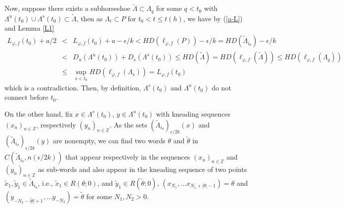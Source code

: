 \documentclass[12pt]{amsart}
\providecommand{\abs}[1]{\lvert#1\rvert}
\theoremstyle{plain} %
\theoremstyle{definition} %
\numberwithin{equation}{section}
\begin{document}
Now, suppose there exists a subhorseshoe $\widetilde{\Lambda}\subset\Lambda_q$ for some $q<t_0$ with $\Lambda ^u(t_0) \cup \Lambda ^s(t_0) \subset \widetilde{\Lambda}$, then as $\Lambda_t\subset P$ for $t_0<t\leq t(h)$, we have by (\ref{a-L}) and Lemma \ref{L1}
\begin{eqnarray*}
L_{\varphi, f}(t_0)+a/2 &<& L_{\varphi, f}(t_0)+a-\epsilon/k <HD(\ell_{\varphi,f}(P))-\epsilon/k =HD(\tilde{\Lambda}_{i_0}) -\epsilon/k \\ &<& D_u(\Lambda ^u(t_0))+D_s(\Lambda ^s(t_0)) \leq HD(\widetilde{\Lambda})=HD(\ell_{\varphi,f}(\widetilde{\Lambda})) \leq HD(\ell_{\varphi,f}(\Lambda_q))\\ &\leq& \sup \limits_{s <t_0} HD(\ell_{\varphi,f}(\Lambda_s)) = L_{\varphi, f}(t_0)
\end{eqnarray*}
which is a contradiction. Then, by definition, $ \Lambda^s(t_0)$ and $ \Lambda^u(t_0)$ do not connect before $t_0$.

On the other hand, fix $x\in \Lambda ^s(t_0)$, $y\in \Lambda ^u(t_0)$ with kneading sequences $(x_n)_{n\in \mathbb{Z}}$, respectively $(y_n)_{n\in \mathbb{Z}}$. As the sets $(\tilde{\Lambda}_{i_0})_{\epsilon/2k}(x)$ and $(\tilde{\Lambda}_{i_0})_{\epsilon/2k}(y)$ are nonempty, we can find two words $\theta$ and $\tilde{\theta}$ in $C(\tilde{\Lambda}_{i_0},n(\epsilon/2k))$ that appear respectively in the sequences $(x_n)_{n\in \mathbb{Z}}$ and $(y_n)_{n\in \mathbb{Z}}$ as sub-words and also appear in the kneading sequence of two points $\tilde{x}_1, \tilde{y}_1\in \tilde{\Lambda}_{i_0}$, i.e., $\tilde{x}_1 \in R(\theta;0)$, and $\tilde{y}_1 \in R(\tilde{\theta};0)$, $(x_{N_1}, \dots x_{N_1+\abs{\theta}-1})=\theta$ and $(y_{-N_2-\abs{\tilde{\theta}}+1}, \dots y_{-N_2})=\tilde{\theta}$ for some $N_1,N_2>0$.
\end{document}
